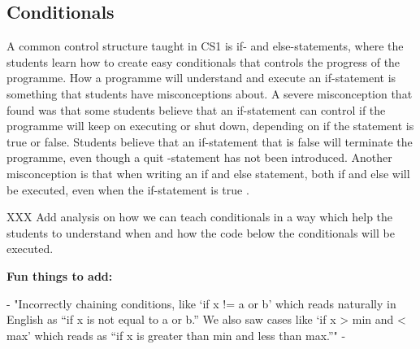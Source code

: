 \subsection{Conditionals}

A common control structure taught in CS1 is if- and else-statements, where 
the students learn how to create easy conditionals that controls the progress 
of the programme. How a programme will understand and execute an if-statement 
is something that students have misconceptions about. A severe misconception 
that \textcite{Plass2015Variables} found was that some students believe that 
an if-statement can control if the programme will keep on executing or shut 
down, depending on if the statement is true or false. Students believe that 
an if-statement that is false will terminate the programme, even though a quit
-statement has not been introduced. Another misconception is that when 
writing an if and else statement, both if and else will be executed, even 
when the if-statement is true \parencite{MisconceptionsSurvey2017}.

XXX Add analysis on how we can teach conditionals in a way which help the 
students to understand when and how the code below the conditionals will be 
executed.


\textbf{Fun things to add:}

- "Incorrectly chaining conditions, like ‘if x != a or b’ which reads 
naturally in English as “if x is not equal to a or b.” We also saw cases like 
‘if x > min and < max’ which reads as “if x is greater than min and less than 
max.”" - \parencite{GuoMarkelZhang2020}